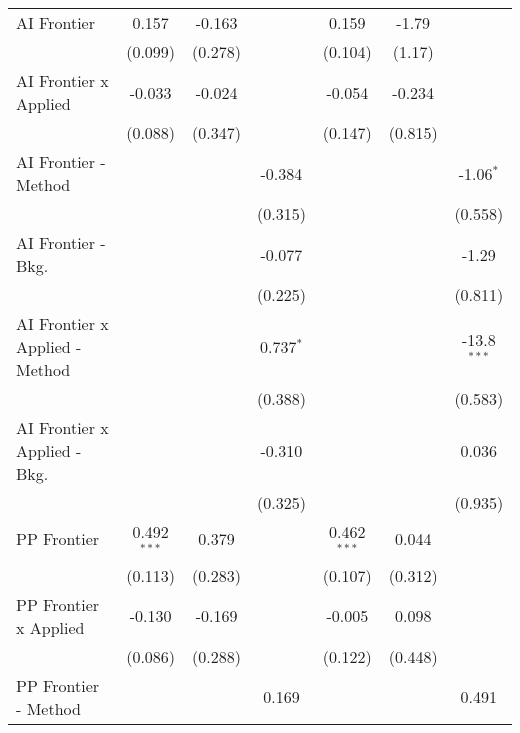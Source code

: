 \begin{tabular}{lcccccc}
   AI Frontier                    & 0.157         & -0.163  &              & 0.159         & -1.79        &   \\   
                                  & (0.099)       & (0.278) &              & (0.104)       & (1.17)       &   \\   
   AI Frontier x Applied          & -0.033        & -0.024  &              & -0.054        & -0.234       &   \\   
                                  & (0.088)       & (0.347) &              & (0.147)       & (0.815)      &   \\   
   AI Frontier - Method           &               &         & -0.384       &               &              & -1.06$^{*}$\\   
                                  &               &         & (0.315)      &               &              & (0.558)\\   
   AI Frontier - Bkg.             &               &         & -0.077       &               &              & -1.29\\   
                                  &               &         & (0.225)      &               &              & (0.811)\\   
   AI Frontier x Applied - Method &               &         & 0.737$^{*}$  &               &              & -13.8$^{***}$\\   
                                  &               &         & (0.388)      &               &              & (0.583)\\   
   AI Frontier x Applied - Bkg.   &               &         & -0.310       &               &              & 0.036\\   
                                  &               &         & (0.325)      &               &              & (0.935)\\   
   PP Frontier                    & 0.492$^{***}$ & 0.379   &              & 0.462$^{***}$ & 0.044        &   \\   
                                  & (0.113)       & (0.283) &              & (0.107)       & (0.312)      &   \\   
   PP Frontier x Applied          & -0.130        & -0.169  &              & -0.005        & 0.098        &   \\   
                                  & (0.086)       & (0.288) &              & (0.122)       & (0.448)      &   \\   
   PP Frontier - Method           &               &         & 0.169        &               &              & 0.491\\   

\end{tabular}
